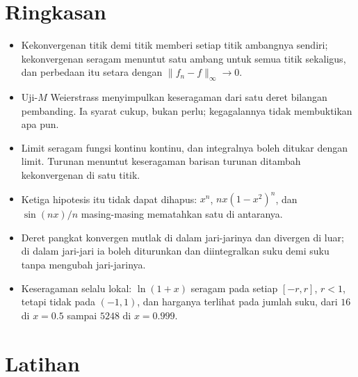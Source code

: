 \section{Ringkasan}

\begin{ringkasan}
\begin{itemize}
\item Kekonvergenan titik demi titik memberi setiap titik ambangnya sendiri;
      kekonvergenan seragam menuntut satu ambang untuk semua titik sekaligus,
      dan perbedaan itu setara dengan $\|f_n-f\|_\infty\to0$.
\item Uji-$M$ Weierstrass menyimpulkan keseragaman dari satu deret bilangan
      pembanding. Ia syarat cukup, bukan perlu; kegagalannya tidak membuktikan
      apa pun.
\item Limit seragam fungsi kontinu kontinu, dan integralnya boleh ditukar dengan
      limit. Turunan menuntut keseragaman barisan turunan ditambah kekonvergenan
      di satu titik.
\item Ketiga hipotesis itu tidak dapat dihapus: $x^n$, $nx(1-x^2)^n$, dan
      $\sin(nx)/n$ masing-masing mematahkan satu di antaranya.
\item Deret pangkat konvergen mutlak di dalam jari-jarinya dan divergen di luar;
      di dalam jari-jari ia boleh diturunkan dan diintegralkan suku demi suku
      tanpa mengubah jari-jarinya.
\item Keseragaman selalu lokal: $\ln(1+x)$ seragam pada setiap $[-r,r]$, $r<1$,
      tetapi tidak pada $(-1,1)$, dan harganya terlihat pada jumlah suku, dari
      $16$ di $x=0.5$ sampai $5248$ di $x=0.999$.
\end{itemize}
\end{ringkasan}

\section{Latihan}

